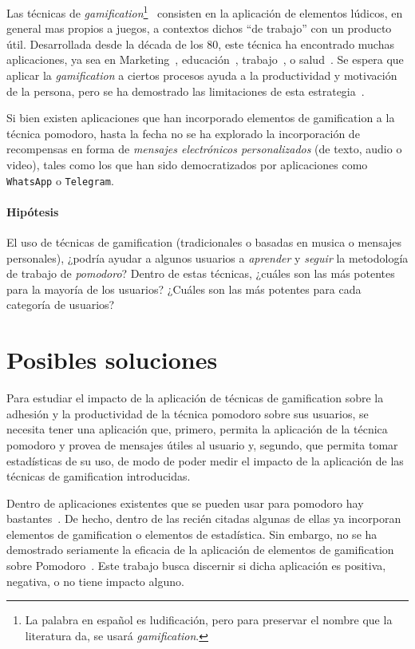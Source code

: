 \documentclass[12pt,letterpaper]{report}
\let\oldparagraph\paragraph
\renewcommand{\paragraph}[1]{\oldparagraph{#1}\mbox{}}
\begin{document}
Las técnicas de \emph{gamification}\footnote{La palabra en español es ludificación, pero para preservar el nombre que la
literatura da, se usará \emph{gamification}.}~\cite{deterding2011gamification} consisten en la aplicación de elementos
lúdicos, en general mas propios a juegos, a contextos dichos ``de trabajo'' con un producto útil.  Desarrollada desde
la década de los 80, este técnica ha encontrado muchas aplicaciones, ya sea en Marketing~\cite{hamari2010game},
educación~\cite{desousa2014systematic-gamification}, trabajo~\cite{oravec2015gamification}, o
salud~\cite{pereira2014gamification-review}. Se espera que aplicar la \emph{gamification} a ciertos procesos ayuda a la
productividad y motivación de la persona, pero se ha demostrado las limitaciones de esta
estrategia~\cite{hamari2014gamification}.

Si bien existen aplicaciones que han incorporado elementos de gamification a la técnica pomodoro, hasta la fecha no se
ha explorado la incorporación de recompensas en forma de \emph{mensajes electrónicos personalizados} (de texto, audio o
video), tales como los que han sido democratizados por aplicaciones como \texttt{WhatsApp} o \texttt{Telegram}.

\paragraph{Hipótesis} El uso de técnicas de gamification (tradicionales o basadas en musica o mensajes personales),
¿podría ayudar a algunos usuarios a \emph{aprender} y \emph{seguir} la metodología de trabajo de \emph{pomodoro}? Dentro
de estas técnicas, ¿cuáles son las más potentes para la mayoría de los usuarios? ¿Cuáles son las más potentes para cada
categoría de usuarios?

\newpage
\section{Posibles soluciones}\label{posibles-soluciones}

Para estudiar el impacto de la aplicación de técnicas de gamification sobre la adhesión y la productividad de la técnica
pomodoro sobre sus usuarios, se necesita tener una aplicación que, primero, permita la aplicación de la técnica pomodoro
y provea de mensajes útiles al usuario y, segundo, que permita tomar estadísticas de su uso, de modo de poder medir el
impacto de la aplicación de las técnicas de gamification introducidas.

Dentro de aplicaciones existentes que se pueden usar para pomodoro hay bastantes~\cite{forest-stayfocused,
focus-extension, pomodorium, teamviz}. De hecho, dentro de las recién citadas algunas de ellas ya incorporan elementos
de gamification o elementos de estadística. Sin embargo, no se ha demostrado seriamente la eficacia de la aplicación de
elementos de gamification sobre Pomodoro~\cite{hamari2014gamification}. Este trabajo busca discernir si dicha aplicación
es positiva, negativa, o no tiene impacto alguno.
\end{document}
